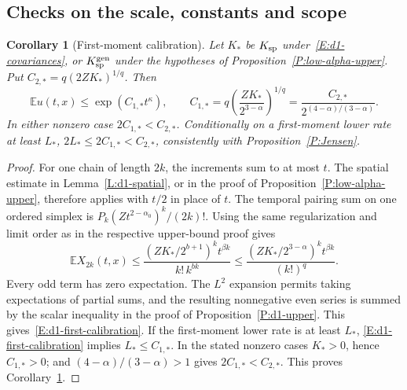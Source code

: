\documentclass[12pt,oneside,openany]{book}
\makeatletter
\let\lean@pending\@empty
\newcommand{\LeanMarker}[1]{\gdef\lean@pending{#1}}
\numberwithin{equation}{section}
\newtheorem{corollary}[theorem]{Corollary}
\theoremstyle{nogostyle}
\theoremstyle{definition}
\newcommand{\E}{\mathbb{E}}
\makeatother
\begin{document}
\subsection{Checks on the scale, constants and scope}

\LeanMarker{C:d1-first-calibration}
\begin{corollary}[First-moment calibration]\label{C:d1-first-calibration}
  Let $K_*$ be $K_{\rm sp}$ under~\eqref{E:d1-covariances}, or $K_{\rm sp}^{\rm
  gen}$ under the hypotheses of Proposition~\ref{P:low-alpha-upper}. Put
  $C_{2,*} = q(2ZK_*)^{1/q}$. Then
  \begin{equation}\label{E:d1-first-calibration}
    \E u(t,x)\le\exp(C_{1,*}t^\kappa),\qquad
    C_{1,*}=q\left(\frac{ZK_*}{2^{3-\alpha}}\right)^{1/q}
    =\frac{C_{2,*}}{2^{(4-\alpha)/(3-\alpha)}}.
  \end{equation}
  In either nonzero case $2C_{1,*} < C_{2,*}$. Conditionally on a first-moment
  lower rate at least $L_*$, $2L_* \le 2C_{1,*} < C_{2,*}$, consistently with
  Proposition~\ref{P:Jensen}.
\end{corollary}

\begin{proof}
  For one chain of length $2k$, the increments sum to at most $t$. The spatial
  estimate in Lemma~\ref{L:d1-spatial}, or in the proof of
  Proposition~\ref{P:low-alpha-upper}, therefore applies with $t/2$ in place of
  $t$. The temporal pairing sum on one ordered simplex is
  $P_k(Zt^{2-\alpha_0})^k/(2k)!$. Using the same regularization and limit order
  as in the respective upper-bound proof gives
  \[
    \E X_{2k}(t,x)
    \le\frac{(ZK_*/2^{b+1})^k t^{\beta k}}{k!\,k^{bk}}
    \le\frac{(ZK_*/2^{3-\alpha})^k t^{\beta k}}{(k!)^q}.
  \]
  Every odd term has zero expectation. The $L^2$ expansion permits taking
  expectations of partial sums, and the resulting nonnegative even series is
  summed by the scalar inequality in the proof of Proposition~\ref{P:d1-upper}.
  This gives~\eqref{E:d1-first-calibration}. If the first-moment lower rate is
  at least $L_*$, \eqref{E:d1-first-calibration} implies $L_* \le C_{1,*}$. In
  the stated nonzero cases $K_* > 0$, hence $C_{1,*} > 0$; and
  $(4-\alpha)/(3-\alpha) > 1$ gives $2C_{1,*} < C_{2,*}$. This proves
  Corollary~\ref{C:d1-first-calibration}.
\end{proof}
\end{document}
